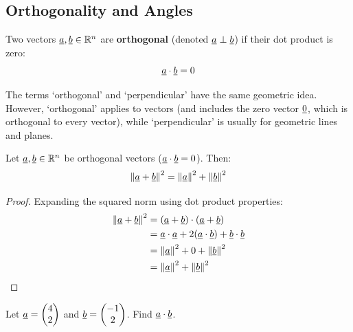 \subsection{Orthogonality and Angles}

\begin{definition}
    Two vectors $\underline{a}, \underline{b} \in \mathbb{R}^n$ are \textbf{orthogonal} (denoted $\underline{a} \perp \underline{b}$) if their dot product is zero:
    \[
        \underline{a} \cdot \underline{b} = 0
    \]
\end{definition}

\begin{remark}
    The terms `orthogonal' and `perpendicular' have the same geometric idea. However, `orthogonal' applies to vectors (and includes the zero vector $\underline{0}$, which is orthogonal to every vector), while `perpendicular' is usually for geometric lines and planes.
\end{remark}

\begin{example}
    Let $\underline{a}, \underline{b} \in \mathbb{R}^n$ be orthogonal vectors ($\underline{a} \cdot \underline{b} = 0$). Then:
    \[
        \left\| \underline{a} + \underline{b} \right\|^2 = \left\| \underline{a} \right\|^2 + \left\| \underline{b} \right\|^2
    \]
    \begin{proof}
        Expanding the squared norm using dot product properties:
        \begin{align*}
            \left\| \underline{a} + \underline{b} \right\|^2 &= (\underline{a} + \underline{b}) \cdot (\underline{a} + \underline{b}) \\
            &= \underline{a} \cdot \underline{a} + 2(\underline{a} \cdot \underline{b}) + \underline{b} \cdot \underline{b} \\ 
            &= \left\| \underline{a} \right\|^2 + 0 + \left\| \underline{b} \right\|^2 \\ 
            &= \left\| \underline{a} \right\|^2 + \left\| \underline{b} \right\|^2
        \end{align*}
    \end{proof}
\end{example}

\begin{exercise}
    Let $\underline{a} = \begin{pmatrix} 4 \\ 2 \end{pmatrix}$ and $\underline{b} = \begin{pmatrix} -1 \\ 2 \end{pmatrix}$. Find $\underline{a} \cdot \underline{b}$.
\end{exercise}


